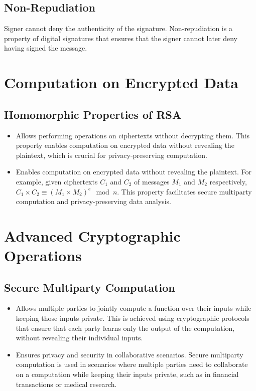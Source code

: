 \documentclass[11pt]{article}
\begin{document}
\subsection{Non-Repudiation}
Signer cannot deny the authenticity of the signature. Non-repudiation is a property of digital signatures that ensures that the signer cannot later deny having signed the message.

\section{Computation on Encrypted Data}
\subsection{Homomorphic Properties of RSA}
\begin{itemize}
    \item Allows performing operations on ciphertexts without decrypting them. This property enables computation on encrypted data without revealing the plaintext, which is crucial for privacy-preserving computation.
    \item Enables computation on encrypted data without revealing the plaintext. For example, given ciphertexts $C_1$ and $C_2$ of messages $M_1$ and $M_2$ respectively, $C_1 \times C_2 \equiv (M_1 \times M_2)^e \mod n$. This property facilitates secure multiparty computation and privacy-preserving data analysis.
\end{itemize}

\section{Advanced Cryptographic Operations}
\subsection{Secure Multiparty Computation}
\begin{itemize}
    \item Allows multiple parties to jointly compute a function over their inputs while keeping those inputs private. This is achieved using cryptographic protocols that ensure that each party learns only the output of the computation, without revealing their individual inputs.
    \item Ensures privacy and security in collaborative scenarios. Secure multiparty computation is used in scenarios where multiple parties need to collaborate on a computation while keeping their inputs private, such as in financial transactions or medical research.
\end{itemize}
\end{document}
